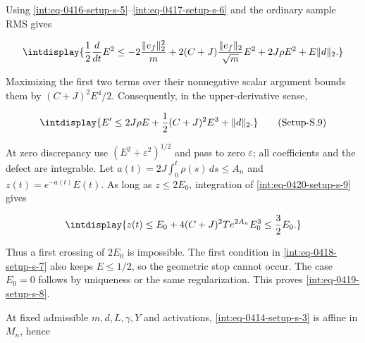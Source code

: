 Using \hyperref[int:eq-setup-s-5]{\eqref{int:eq-0416-setup-s-5}}--\allowbreak \hyperref[int:eq-setup-s-6]{\eqref{int:eq-0417-setup-s-6}} and the ordinary sample RMS gives


\begingroup\renewcommand{\theHequation}{intdisplay.862}
\begin{equation*}
\intdisplay{
\frac12\frac d{dt}E^2
\le-2\frac{\|e_f\|_2^2}{m}
 +2(C+J)\frac{\|e_f\|_2}{\sqrt m}E^2
 +2J\rho E^2+E\|d\|_2.
}
\end{equation*}
\endgroup


Maximizing the first two terms over their nonnegative scalar argument bounds them by \((C+J)^2E^4/2\). Consequently, in the upper-derivative sense,


\label{int:eq-setup-s-9}
\begingroup\renewcommand{\theHequation}{intdisplay.863}
\begin{equation}
\intdisplay{
E'\le 2J\rho E+\frac12(C+J)^2E^3+\|d\|_2.
}
\tag{Setup-S.9}
\label{int:eq-0420-setup-s-9}
\end{equation}
\endgroup


At zero discrepancy use \((E^2+\varepsilon^2)^{1/2}\) and pass to zero \(\varepsilon\); all coefficients and the defect are integrable. Let \(a(t)=2J\int_0^t\rho(s)\,\allowbreak ds\le A_n\) and \(z(t)=e^{-a(t)}E(t)\). As long as \(z\le2E_0\), integration of \hyperref[int:eq-setup-s-9]{\eqref{int:eq-0420-setup-s-9}} gives


\begingroup\renewcommand{\theHequation}{intdisplay.864}
\begin{equation*}
\intdisplay{
z(t)\le E_0+4(C+J)^2T e^{2A_n}E_0^3\le\frac32E_0.
}
\end{equation*}
\endgroup


Thus a first crossing of \(2E_0\) is impossible. The first condition in \hyperref[int:eq-setup-s-7]{\eqref{int:eq-0418-setup-s-7}} also keeps \(E\le1/2\), so the geometric stop cannot occur. The case \(E_0=0\) follows by uniqueness or the same regularization. This proves \hyperref[int:eq-setup-s-8]{\eqref{int:eq-0419-setup-s-8}}.



At fixed admissible \(m,\allowbreak d,\allowbreak L,\allowbreak \gamma,\allowbreak Y\) and activations, \hyperref[int:eq-setup-s-3]{\eqref{int:eq-0414-setup-s-3}} is affine in \(M_n\), hence


